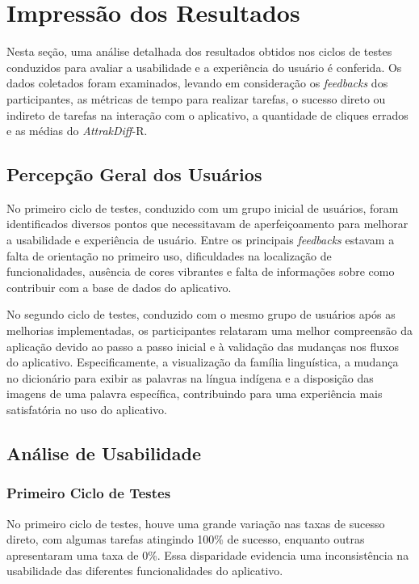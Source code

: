 \section{Impressão dos Resultados}
\label{sec:Impressão dos Resultados}
Nesta seção, uma análise detalhada dos resultados obtidos nos ciclos de testes conduzidos para avaliar a usabilidade e a experiência do usuário é conferida. Os dados coletados foram examinados, levando em consideração os \textit{feedbacks} dos participantes, as métricas de 
tempo para realizar tarefas, o sucesso direto ou indireto de tarefas na interação com o aplicativo, a quantidade de cliques errados e as médias do \textit{AttrakDiff}-R.

\subsection{Percepção Geral dos Usuários}
\label{sec:Percepção Geral dos Usuários}
No primeiro ciclo de testes, conduzido com um grupo inicial de usuários, foram identificados diversos pontos que necessitavam de aperfeiçoamento para melhorar a usabilidade e experiência de usuário. Entre os principais \textit{feedbacks} estavam a falta de orientação no primeiro uso, 
dificuldades na localização de funcionalidades, ausência de cores vibrantes e falta de informações sobre como contribuir com a base de dados do aplicativo.

No segundo ciclo de testes, conduzido com o mesmo grupo de usuários após as melhorias implementadas, os participantes relataram uma melhor compreensão da aplicação devido ao passo a passo inicial e à validação das mudanças nos fluxos do aplicativo. Especificamente, a visualização da 
família linguística, a mudança no dicionário para exibir as palavras na língua indígena e a disposição das imagens de uma palavra específica, contribuindo para uma experiência mais satisfatória no uso do aplicativo.

\subsection{Análise de Usabilidade}
\label{sec:Análise de Usabilidade}

\subsubsection{Primeiro Ciclo de Testes}
\label{sec:Primeiro Ciclo de Testes}

No primeiro ciclo de testes, houve uma grande variação nas taxas de sucesso direto, com algumas tarefas atingindo 100\% de sucesso, enquanto outras apresentaram uma taxa de 0\%. Essa disparidade evidencia uma inconsistência na usabilidade das diferentes funcionalidades do aplicativo.

